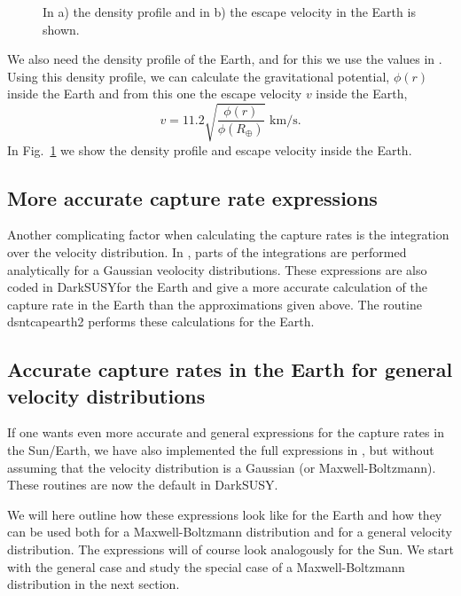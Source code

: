 \documentclass[a4paper,10pt,oneside]{book}
\newcommand{\code}[1]{\ft{#1}}
\newcommand{\ds}{{\sffamily DarkSUSY}}
\newcommand{\ft}[1]{\textsf{#1}}
\begin{document}
\begin{figure}
\centerline{}
\caption{In a) the density profile and in b) the escape velocity in the Earth is shown.}
\label{fig:eadensvesc}
\end{figure}

We also need the density profile of the Earth, and for this we use the
values in \cite{EncBrit}. Using this density profile, we can calculate
the gravitational potential, $\phi(r)$ inside the Earth and from this
one the escape velocity $v$ inside the Earth,
\begin{equation}
   \label{eq:vesc}
   v = 11.2 \sqrt{\frac{\phi(r)}{\phi(R_\oplus)}} \mbox{~km/s.}
\end{equation}
In Fig.~\ref{fig:eadensvesc} we show the density profile and escape
velocity inside the Earth. 

\subsection{More accurate capture rate expressions}

Another complicating factor when calculating the capture rates is the
integration over the velocity 
distribution. In \cite{Gould:1987ir}, parts of the integrations are
performed analytically for a Gaussian veolocity distributions. These
expressions are also coded in \ds for the Earth and give a more
accurate calculation of the capture rate in the Earth than the
approximations given above. The routine \code{dsntcapearth2} performs
these calculations for the Earth.

\subsection{Accurate capture rates in the Earth for general velocity distributions}


If one wants even more accurate and general expressions for the
capture rates in the Sun/Earth, we have also implemented the full
expressions in \cite{Gould:1987ir}, but without assuming that the velocity
distribution is a Gaussian (or Maxwell-Boltzmann). These routines are
now the default in \ds.

We will here outline how these expressions look
like for the Earth and how they can be used both for a Maxwell-Boltzmann
distribution and for a general velocity distribution. The expressions
will of course look analogously for the Sun. We start with
the general case and study the special case of a Maxwell-Boltzmann
distribution in the next section. 
\end{document}
